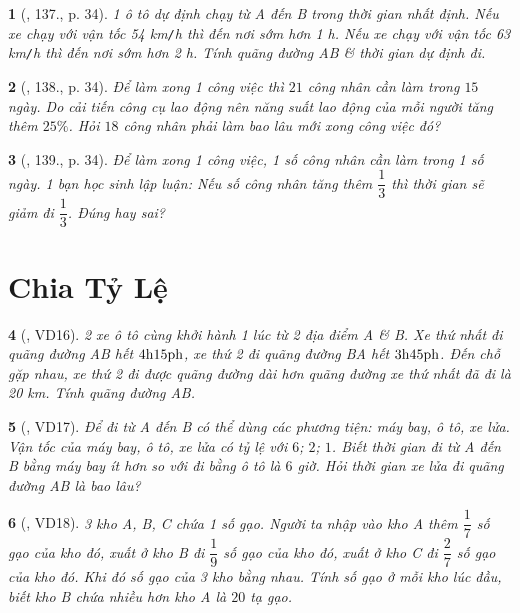 \documentclass{article}
\newtheorem{baitoan}{}
\begin{document}
\begin{baitoan}[\cite{Tuyen_Toan_7}, 137., p. 34]
	1 ô tô dự định chạy từ A đến B trong thời gian nhất định. Nếu xe chạy với vận tốc {\rm54 km{\tt/}h} thì đến nơi sớm hơn {\rm1 h}. Nếu xe chạy với vận tốc {\rm63 km{\tt/}h} thì đến nơi sớm hơn {\rm2 h}. Tính quãng đường AB \& thời gian dự định đi.
\end{baitoan}

\begin{baitoan}[\cite{Tuyen_Toan_7}, 138., p. 34]
	Để làm xong 1 công việc thì $21$ công nhân cần làm trong $15$ ngày. Do cải tiến công cụ lao động nên năng suất lao động của mỗi người tăng thêm $25\%$. Hỏi $18$ công nhân phải làm bao lâu mới xong công việc đó?
\end{baitoan}

\begin{baitoan}[\cite{Tuyen_Toan_7}, 139., p. 34]
	Để làm xong 1 công việc, 1 số công nhân cần làm trong 1 số ngày. 1 bạn học sinh lập luận: Nếu số công nhân tăng thêm $\dfrac{1}{3}$ thì thời gian sẽ giảm đi $\dfrac{1}{3}$. Đúng hay sai?
\end{baitoan}


\section{Chia Tỷ Lệ}

\begin{baitoan}[\cite{Binh_Toan_7_tap_1}, VD16]
	2 xe ô tô cùng khởi hành 1 lúc từ 2 địa điểm A \& B. Xe thứ nhất đi quãng đường AB hết $\rm4h15ph$, xe thứ 2 đi quãng đường BA hết $\rm3h45ph$. Đến chỗ gặp nhau, xe thứ 2 đi được quãng đường dài hơn quãng đường xe thứ nhất đã đi là {\rm20 km}. Tính quãng đường AB.
\end{baitoan}

\begin{baitoan}[\cite{Binh_Toan_7_tap_1}, VD17]
	Để đi từ A đến B có thể dùng các phương tiện: máy bay, ô tô, xe lửa. Vận tốc của máy bay, ô tô, xe lửa có tỷ lệ với $6$; $2$; $1$. Biết thời gian đi từ A đến B bằng máy bay ít hơn so với đi bằng ô tô là $6$ giờ. Hỏi thời gian xe lửa đi quãng đường AB là bao lâu?
\end{baitoan}

\begin{baitoan}[\cite{Binh_Toan_7_tap_1}, VD18]
	3 kho A, B, C chứa 1 số gạo. Người ta nhập vào kho A thêm $\dfrac{1}{7}$ số gạo của kho đó, xuất ở kho B đi $\dfrac{1}{9}$ số gạo của kho đó, xuất ở kho C đi $\dfrac{2}{7}$ số gạo của kho đó. Khi đó số gạo của 3 kho bằng nhau. Tính số gạo ở mỗi kho lúc đầu, biết kho B chứa nhiều hơn kho A là $20$ tạ gạo.
\end{baitoan}
\end{document}
